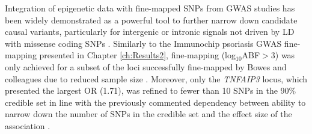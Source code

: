 Integration of epigenetic data with fine-mapped SNPs from GWAS studies has been widely demonstrated as a powerful tool to further narrow down candidate causal variants, particularly for intergenic or intronic signals not driven by LD with missense coding SNPs \parencite{Bunt2015,Farh2015}. Similarly to the Immunochip psoriasis GWAS fine-mapping presented in Chapter \ref{ch:Results2}, fine-mapping (log$_{10}$ABF$>$3) was only achieved for a subset of the loci successfully fine-mapped by Bowes and colleagues due to reduced sample size \parencite{Bunt2015}. Moreover, only the \textit{TNFAIP3} locus, which presented the largest OR (1.71), was refined to fewer than 10 SNPs in the 90\% credible set in line with the previously commented dependency between ability to narrow down the number of SNPs in the credible set and the effect size of the association \parencite{Bunt2015}.

 
